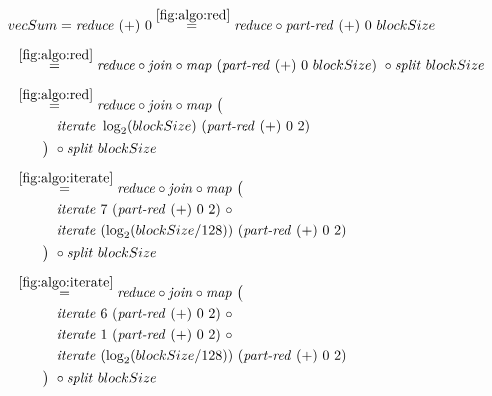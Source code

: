 \begin{align*}
  &\hspace{-1.5em}vecSum = \reduce\ (+)\ 0
%
  \overset{\ref{fig:algo:red}}{=\hspace{.2em}}
      \reduce \circ \partRed\ (+)\ 0\ blockSize\\[.5em]
%
  &\hspace{-2em}\quad\begin{aligned}
    &\overset{\ref{fig:algo:red}}{=\hspace{.2em}}
      \reduce \circ \join \circ \map\ (\partRed\ (+)\ 0\ blockSize)\ \circ \splitN\ blockSize
  \end{aligned}\\[.5em]
%
  &\hspace{-2em}\quad\begin{aligned}
    &\overset{\ref{fig:algo:red}}{=\hspace{.2em}}
      \reduce \circ \join \circ \map\ \big(\\
    &\qquad\quad\iterateN\ \log_{2}(blockSize)\ (\partRed\ (+)\ 0\ 2)\\
    &\qquad\big)\ \circ \splitN\ blockSize
  \end{aligned}\\[.5em]
%
  &\hspace{-2em}\quad\begin{aligned}
    &\overset{\ref{fig:algo:iterate}}{=\hspace{.2em}}
      \reduce \circ \join \circ \map\ \big(\\
    &\qquad\quad\iterateN\ 7\ (\partRed\ (+)\ 0\ 2)\ \circ\\
    &\qquad\quad\iterateN\ (\log_{2}(blockSize/128))\ (\partRed\ (+)\ 0\ 2)\\
    &\qquad\big)\ \circ \splitN\ blockSize
  \end{aligned}\\[.5em]
%
  &\hspace{-2em}\quad\begin{aligned}
    &\overset{\ref{fig:algo:iterate}}{=\hspace{.2em}}
      \reduce \circ \join \circ \map\ \big(\\
    &\qquad\quad\iterateN\ 6\ (\partRed\ (+)\ 0\ 2)\ \circ\\
    &\qquad\quad\iterateN\ 1\ (\partRed\ (+)\ 0\ 2)\ \circ\\
    &\qquad\quad\iterateN\ (\log_{2}(blockSize/128))\ (\partRed\ (+)\ 0\ 2)\\
    &\qquad\big)\ \circ \splitN\ blockSize
  \end{aligned}\\[.5em]
%
\end{align*}

